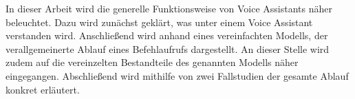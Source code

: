 In dieser Arbeit wird die generelle Funktionsweise von Voice Assistants näher beleuchtet. Dazu wird zunächst geklärt, was unter einem Voice Assistant verstanden wird. Anschließend wird anhand eines vereinfachten Modells, der verallgemeinerte Ablauf eines Befehlaufrufs dargestellt. An dieser Stelle wird zudem auf die vereinzelten Bestandteile des genannten Modells näher eingegangen. Abschließend wird mithilfe von zwei Fallstudien der gesamte Ablauf konkret erläutert.